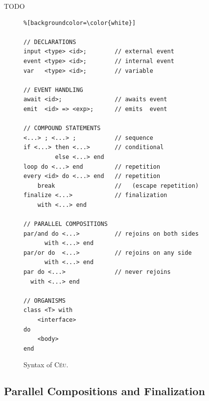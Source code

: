 \documentclass{acm_proc_article-sp}
\newcommand{\CEU}{\textsc{C\'{e}u}\xspace}
\newcommand{\1}{\;}
\newcommand{\2}{\;\;}
\newcommand{\3}{\;\;\;}
\newcommand{\5}{\;\;\;\;\;}
\begin{document}
TODO

\begin{figure}[t]
\begin{lstlisting}%[backgroundcolor=\color{white}]

// DECLARATIONS
input <type> <id>;        // external event
event <type> <id>;        // internal event
var   <type> <id>;        // variable

// EVENT HANDLING
await <id>;               // awaits event
emit  <id> => <exp>;      // emits  event

// COMPOUND STATEMENTS
<...> ; <...> ;           // sequence
if <...> then <...>       // conditional
         else <...> end
loop do <...> end         // repetition
every <id> do <...> end   // repetition
    break                 //   (escape repetition)
finalize <...>            // finalization
    with <...> end

// PARALLEL COMPOSITIONS
par/and do <...>          // rejoins on both sides
      with <...> end
par/or do  <...>          // rejoins on any side
      with <...> end
par do <...>              // never rejoins
  with <...> end

// ORGANISMS
class <T> with
    <interface>
do
    <body>
end
\end{lstlisting}
\caption{ Syntax of \CEU.\newline
{\small %
}%
\label{lst.syntax}
}
\end{figure}

\subsection{Parallel Compositions and Finalization}

\end{document}
